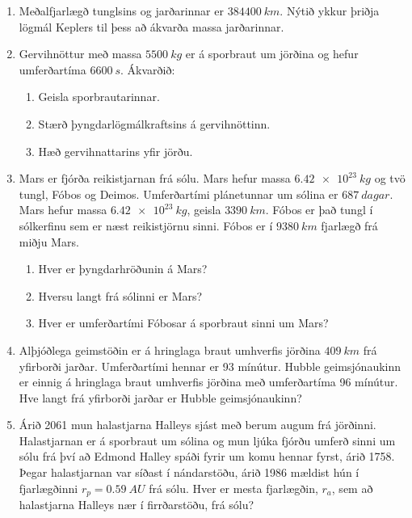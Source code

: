 \begin{enumerate}[label = \textbf{Dæmi \thechapter.\arabic*.}]
\item Meðalfjarlægð tunglsins og jarðarinnar er $\SI{384400}{km}$. Nýtið ykkur þriðja lögmál Keplers til þess að ákvarða massa jarðarinnar.

\item Gervihnöttur með massa $\SI{5500}{kg}$ er á sporbraut um jörðina og hefur umferðartíma $\SI{6600}{s}$. Ákvarðið:
\begin{enumerate}[label = \textbf{(\alph*)}]
    \item Geisla sporbrautarinnar.
    \item Stærð þyngdarlögmálkraftsins á gervihnöttinn.
    \item Hæð gervihnattarins yfir jörðu.
\end{enumerate}

\item Mars er fjórða reikistjarnan frá sólu. Mars hefur massa $\SI{6.42e23}{kg}$ og tvö tungl, Fóbos og Deimos. Umferðartími plánetunnar um sólina er $\SI{687}{dagar}$. Mars hefur massa $\SI{6.42e23}{kg}$, geisla $\SI{3390}{km}$. Fóbos er það tungl í sólkerfinu sem er næst reikistjörnu sinni. Fóbos er í $\SI{9380}{km}$ fjarlægð frá miðju Mars. 
\begin{enumerate}[label = \textbf{(\alph*)}]
    \item Hver er þyngdarhröðunin á Mars?
    
    \item Hversu langt frá sólinni er Mars?
    
    \item Hver er umferðartími Fóbosar á sporbraut sinni um Mars?
\end{enumerate}

\item Alþjóðlega geimstöðin er á hringlaga braut umhverfis jörðina $\SI{409}{km}$ frá yfirborði jarðar. Umferðartími hennar er 93 mínútur. Hubble geimsjónaukinn er einnig á hringlaga braut umhverfis jörðina með umferðartíma 96 mínútur. Hve langt frá yfirborði jarðar er Hubble geimsjónaukinn?

\item Árið 2061 mun halastjarna Halleys sjást með berum augum frá jörðinni. Halastjarnan er á sporbraut um sólina og mun ljúka fjórðu umferð sinni um sólu frá því að Edmond Halley spáði fyrir um komu hennar fyrst, árið 1758. Þegar halastjarnan var síðast í nándarstöðu, árið 1986 mældist hún í fjarlægðinni $r_p = \SI{0.59}{AU}$ frá sólu. Hver er mesta fjarlægðin, $r_a$, sem að halastjarna Halleys nær í firrðarstöðu, frá sólu?


\end{enumerate}
